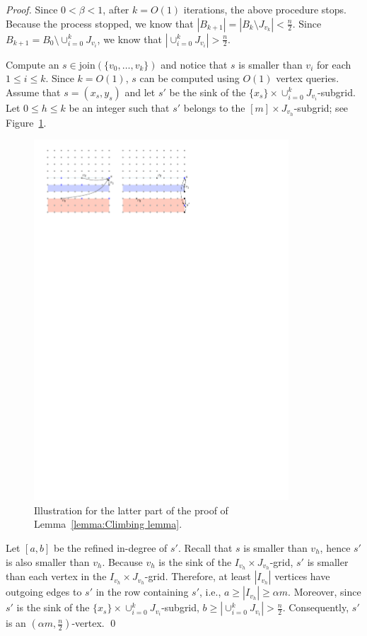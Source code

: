\documentclass[runningheads,a4paper]{llncs}
\newcommand{\indegree}{refined in-degree\xspace}
\newcommand{\join}{\mbox{join}\xspace}
\begin{document}
\begin{proof}
Since $0 < \beta < 1$, after $k = O(1)$ iterations, the above procedure stops. 
Because the process stopped, we know that $|B_{k+1}| = |B_k \setminus J_{v_k}| <  \frac{n}{2}$.
Since $B_{k+1} = B_0\setminus \cup_{i=0}^k J_{v_i}$, we know that $|\cup_{i=0}^k J_{v_i}| >  \frac{n}{2}$.

Compute an $s \in \join(\{v_0, \ldots, v_k\})$ and notice that $s$ is smaller than $v_i$ for each $1\leq i\leq k$. Since $k = O(1)$, $s$ can be computed using $O(1)$ vertex queries. 
Assume that $s = (x_s, y_s)$ and let $s'$ be the sink of the $\{x_s\}\times \cup_{i=0}^k J_{v_i}$-subgrid. 
Let $0\leq h\leq k$ be an integer such that $s'$ belongs to the $[m]\times J_{v_h}$-subgrid; see Figure~\ref{fig:Climbing Lemma-2}.

\begin{figure}[h]
\centering
\includegraphics[width=0.85\textwidth]{ClimbingLemma-2.pdf}
\caption{\small Illustration for the latter part of the proof of Lemma~\ref{lemma:Climbing lemma}.}
\label{fig:Climbing Lemma-2}
\end{figure}

Let $[a,b]$ be the \indegree of $s'$.
Recall that $s$ is smaller than $v_h$, hence $s'$ is also smaller than $v_h$.
Because $v_h$ is the sink of the $I_{v_h}\times J_{v_h}$-grid, $s'$ is smaller than each vertex in the $I_{v_h}\times J_{v_h}$-grid.
Therefore, at least $|I_{v_h}|$ vertices have outgoing edges to $s'$ in the row containing $s'$, i.e., $a\geq |I_{v_h}| \geq \alpha m$.
Moreover, since $s'$ is the sink of the $\{x_s\}\times \cup_{i=0}^k J_{v_i}$-subgrid, $b \geq |\cup_{i=0}^k J_{v_i}|  >  \frac{n}{2}$.
Consequently, $s'$ is an $(\alpha m,  \frac{n}{2})$-vertex. \qed
\end{proof}
\end{document}
